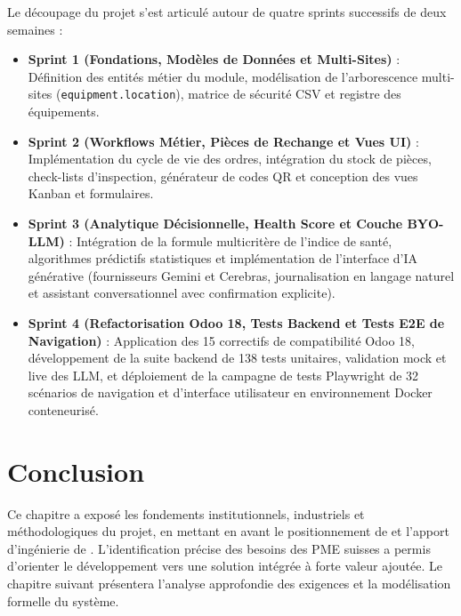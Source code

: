 Le découpage du projet s'est articulé autour de quatre sprints successifs de deux semaines :
\begin{itemize}[leftmargin=1.5cm, label=\textcolor{odooPurple}{\small\textbullet}]
    \item \textbf{Sprint 1 (Fondations, Modèles de Données et Multi-Sites)} : Définition des entités métier du module, modélisation de l'arborescence multi-sites (\texttt{equipment.location}), matrice de sécurité CSV et registre des équipements.
    \item \textbf{Sprint 2 (Workflows Métier, Pièces de Rechange et Vues UI)} : Implémentation du cycle de vie des ordres, intégration du stock de pièces, check-lists d'inspection, générateur de codes QR et conception des vues Kanban et formulaires.
    \item \textbf{Sprint 3 (Analytique Décisionnelle, Health Score et Couche BYO-LLM)} : Intégration de la formule multicritère de l'indice de santé, algorithmes prédictifs statistiques et implémentation de l'interface d'IA générative (fournisseurs Gemini et Cerebras, journalisation en langage naturel et assistant conversationnel avec confirmation explicite).
    \item \textbf{Sprint 4 (Refactorisation Odoo 18, Tests Backend et Tests E2E de Navigation)} : Application des 15 correctifs de compatibilité Odoo 18, développement de la suite backend de 138 tests unitaires, validation mock et live des LLM, et déploiement de la campagne de tests Playwright de 32 scénarios de navigation et d'interface utilisateur en environnement Docker conteneurisé.
\end{itemize}

\section{Conclusion}
Ce chapitre a exposé les fondements institutionnels, industriels et méthodologiques du projet, en mettant en avant le positionnement de \textbf{\companyName} et l'apport d'ingénierie de \textbf{\companySubsidiary}. L'identification précise des besoins des PME suisses a permis d'orienter le développement vers une solution intégrée à forte valeur ajoutée. Le chapitre suivant présentera l'analyse approfondie des exigences et la modélisation formelle du système.
